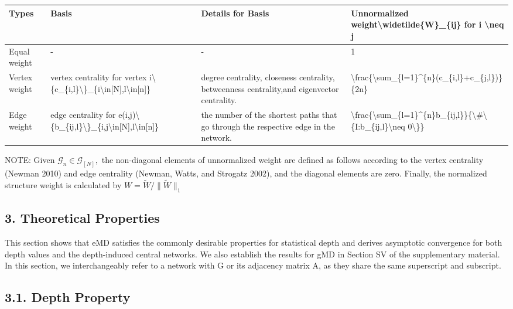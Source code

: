 \documentclass[
  10
]{article}
\newcounter{none} %
\begin{document}
{\def\LTcaptype{none} %
\begin{longtable}[]{@{}|l|l|l|l|@{}}
\toprule\noalign{}
\endhead
\bottomrule\noalign{}
\endlastfoot
\hline
Types & Basis & Details for Basis & Unnormalized
weight\textbackslash widetilde\{W\}\_\{ij\} for i \textbackslash neq
j \\
\hline
Equal weight & - & - & 1 \\
\hline
Vertex weight & vertex centrality for vertex
i\textbackslash\{c\_\{i,l\}\textbackslash\}\_\{i\textbackslash in{[}N{]},l\textbackslash in{[}n{]}\}
& degree centrality, closeness centrality, betweenness centrality,and
eigenvector centrality. &
\textbackslash frac\{\textbackslash sum\_\{l=1\}\^{}\{n\}(c\_\{i,l\}+c\_\{j,l\})\}\{2n\} \\
\hline
Edge weight & edge centrality for
e(i,j)\textbackslash\{b\_\{ij,l\}\textbackslash\}\_\{i,j\textbackslash in{[}N{]},l\textbackslash in{[}n{]}\}
& the number of the shortest paths that go through the respective edge
in the network. &
\textbackslash frac\{\textbackslash sum\_\{l=1\}\^{}\{n\}b\_\{ij,l\}\}\{\textbackslash\#\textbackslash\{I:b\_\{ij,l\}\textbackslash neq
0\textbackslash\}\} \\
\hline
\end{longtable}
}

NOTE: Given \(\mathcal { G } _ { n } \in \mathcal { G } _ { [ N ] } ,\)
the non-diagonal elements of unnormalized weight are defined as follows
according to the vertex centrality (Newman 2010) and edge centrality
(Newman, Watts, and Strogatz 2002), and the diagonal elements are zero.
Finally, the normalized structure weight is calculated by
\(W = \widetilde { W } / \| \widetilde { W } \| _ { 1 }\)

\subsection{3. Theoretical Properties}\label{theoretical-properties}

This section shows that eMD satisfies the commonly desirable properties
for statistical depth and derives asymptotic convergence for both depth
values and the depth-induced central networks. We also establish the
results for gMD in Section SV of the supplementary material. In this
section, we interchangeably refer to a network with G or its adjacency
matrix A, as they share the same superscript and subscript.

\subsection{3.1. Depth Property}\label{depth-property}
\end{document}
